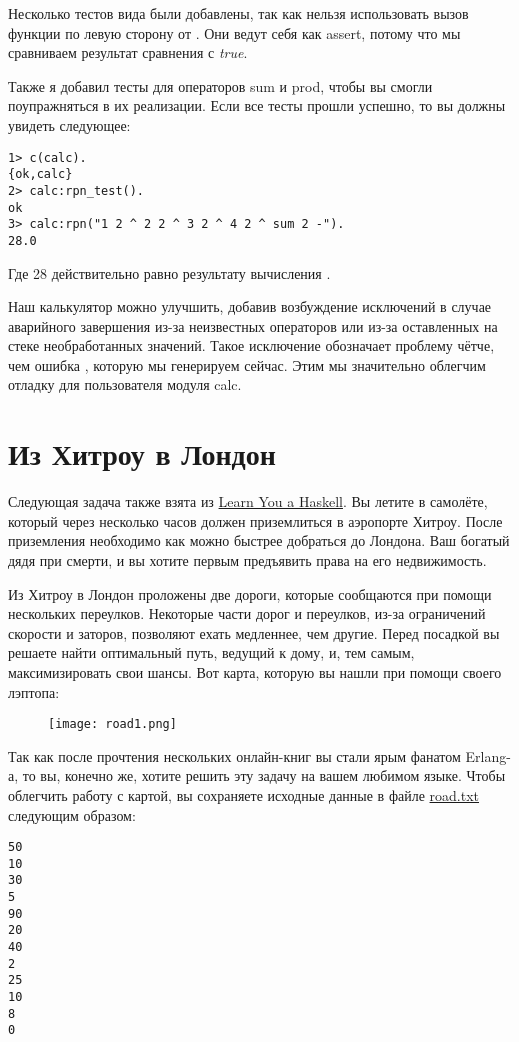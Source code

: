 Несколько тестов вида  были добавлены, так как  нельзя использовать вызов функции по левую сторону от \ops{=\strut}.
Они ведут себя как assert, потому что мы сравниваем результат сравнения с \emph{true}.

Также я добавил тесты для операторов sum и prod, чтобы вы смогли поупражняться в их реализации.
Если все тесты прошли успешно, то вы должны увидеть следующее:
\begin{lstlisting}[style=erlang]
1> c(calc).
{ok,calc}
2> calc:rpn_test().
ok
3> calc:rpn("1 2 ^ 2 2 ^ 3 2 ^ 4 2 ^ sum 2 -").
28.0
\end{lstlisting}

Где 28 действительно равно результату вычисления .

Наш калькулятор можно улучшить, добавив возбуждение исключений  в случае аварийного завершения из\--за неизвестных операторов или из\--за оставленных на стеке необработанных значений.
Такое исключение обозначает проблему чётче, чем ошибка , которую мы генерируем сейчас.
Этим мы значительно облегчим отладку для пользователя модуля calc.

\section{Из Хитроу в Лондон}
\label{heathrow-to-london}
Следующая задача также взята из \href{http://learnyouahaskell.com/functionally-solving-problems#heathrow-to-london}{Learn You a Haskell}.
Вы летите в самолёте, который через несколько часов должен приземлиться в аэропорте Хитроу.
После приземления необходимо как можно быстрее добраться до Лондона.
Ваш богатый дядя при смерти, и вы хотите первым предъявить права на его недвижимость.

Из Хитроу в Лондон проложены две дороги, которые сообщаются при помощи  нескольких переулков.
Некоторые части дорог и переулков, из\--за ограничений скорости и заторов, позволяют ехать медленнее, чем другие.
Перед посадкой вы решаете найти оптимальный путь, ведущий к дому, и, тем самым, максимизировать свои шансы.
Вот карта, которую вы нашли при помощи своего лэптопа:
\begin{figure}[h!]
    \texttt{[image: road1.png]}
\end{figure}

Так как после прочтения нескольких онлайн\--книг вы стали ярым фанатом Erlang\--а, то вы, конечно же, хотите решить эту задачу на вашем любимом языке.
Чтобы облегчить работу с картой, вы сохраняете исходные данные в файле \href{http://learnyousomeerlang.com/static/erlang/road.txt}{road.txt} следующим образом:
\begin{lstlisting}[style=erlang]
50
10
30
5
90
20
40
2
25
10
8
0
\end{lstlisting}

